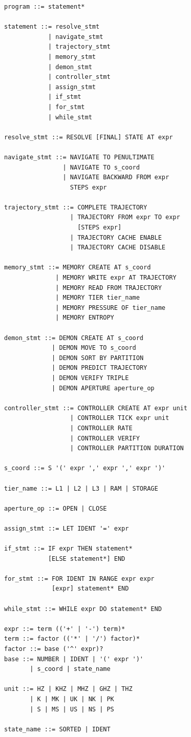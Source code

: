 \documentclass[twocolumn,10pt]{article}
\theoremstyle{definition}
\theoremstyle{remark}
\begin{document}
\begin{verbatim}
program ::= statement*

statement ::= resolve_stmt
            | navigate_stmt
            | trajectory_stmt
            | memory_stmt
            | demon_stmt
            | controller_stmt
            | assign_stmt
            | if_stmt
            | for_stmt
            | while_stmt

resolve_stmt ::= RESOLVE [FINAL] STATE AT expr

navigate_stmt ::= NAVIGATE TO PENULTIMATE
                | NAVIGATE TO s_coord
                | NAVIGATE BACKWARD FROM expr
                  STEPS expr

trajectory_stmt ::= COMPLETE TRAJECTORY
                  | TRAJECTORY FROM expr TO expr
                    [STEPS expr]
                  | TRAJECTORY CACHE ENABLE
                  | TRAJECTORY CACHE DISABLE

memory_stmt ::= MEMORY CREATE AT s_coord
              | MEMORY WRITE expr AT TRAJECTORY
              | MEMORY READ FROM TRAJECTORY
              | MEMORY TIER tier_name
              | MEMORY PRESSURE OF tier_name
              | MEMORY ENTROPY

demon_stmt ::= DEMON CREATE AT s_coord
             | DEMON MOVE TO s_coord
             | DEMON SORT BY PARTITION
             | DEMON PREDICT TRAJECTORY
             | DEMON VERIFY TRIPLE
             | DEMON APERTURE aperture_op

controller_stmt ::= CONTROLLER CREATE AT expr unit
                  | CONTROLLER TICK expr unit
                  | CONTROLLER RATE
                  | CONTROLLER VERIFY
                  | CONTROLLER PARTITION DURATION

s_coord ::= S '(' expr ',' expr ',' expr ')'

tier_name ::= L1 | L2 | L3 | RAM | STORAGE

aperture_op ::= OPEN | CLOSE

assign_stmt ::= LET IDENT '=' expr

if_stmt ::= IF expr THEN statement*
            [ELSE statement*] END

for_stmt ::= FOR IDENT IN RANGE expr expr
             [expr] statement* END

while_stmt ::= WHILE expr DO statement* END

expr ::= term (('+' | '-') term)*
term ::= factor (('*' | '/') factor)*
factor ::= base ('^' expr)?
base ::= NUMBER | IDENT | '(' expr ')'
       | s_coord | state_name

unit ::= HZ | KHZ | MHZ | GHZ | THZ
       | K | MK | UK | NK | PK
       | S | MS | US | NS | PS

state_name ::= SORTED | IDENT
\end{verbatim}
\end{document}
